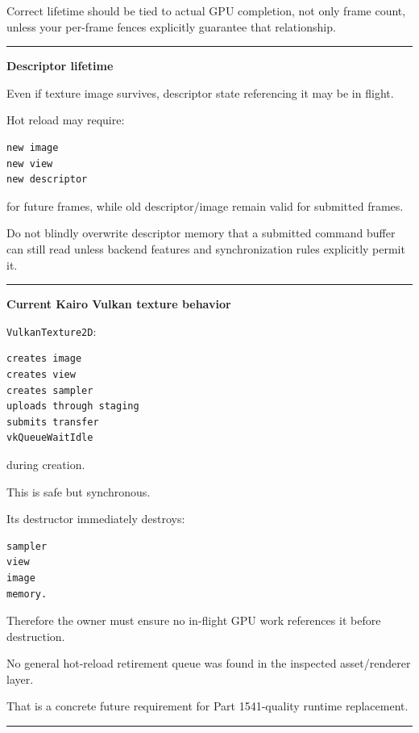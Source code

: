 Correct lifetime should be tied to actual GPU completion, not only frame count, unless your per-frame fences explicitly guarantee that relationship.

\begin{center}\rule{0.5\linewidth}{0.5pt}\end{center}

\textbf{Descriptor lifetime}

Even if texture image survives, descriptor state referencing it may be in flight.

Hot reload may require:

\begin{verbatim}
new image
new view
new descriptor
\end{verbatim}

for future frames, while old descriptor/image remain valid for submitted frames.

Do not blindly overwrite descriptor memory that a submitted command buffer can still read unless backend features and synchronization rules explicitly permit it.

\begin{center}\rule{0.5\linewidth}{0.5pt}\end{center}

\textbf{Current Kairo Vulkan texture behavior}

\texttt{VulkanTexture2D}:

\begin{verbatim}
creates image
creates view
creates sampler
uploads through staging
submits transfer
vkQueueWaitIdle
\end{verbatim}

during creation.

This is safe but synchronous.

Its destructor immediately destroys:

\begin{verbatim}
sampler
view
image
memory.
\end{verbatim}

Therefore the owner must ensure no in-flight GPU work references it before destruction.

No general hot-reload retirement queue was found in the inspected asset/renderer layer.

That is a concrete future requirement for Part 1541-quality runtime replacement.

\begin{center}\rule{0.5\linewidth}{0.5pt}\end{center}

